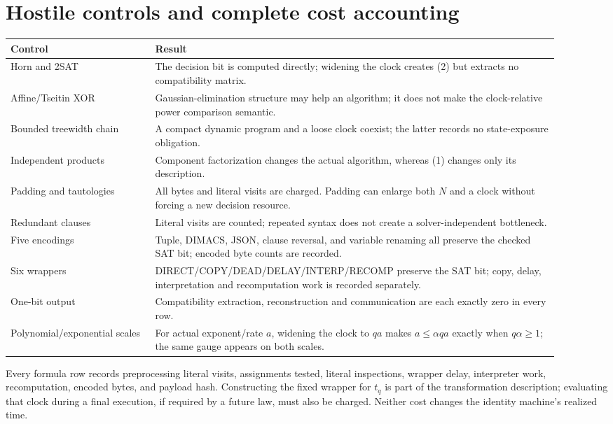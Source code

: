 \documentclass[11pt]{article}
\begin{document}
\section{Hostile controls and complete cost accounting}

\begin{longtable}{p{0.24\linewidth}p{0.67\linewidth}}
\toprule Control & Result\\ \midrule
Horn and 2SAT & The decision bit is computed directly; widening the clock
creates (2) but extracts no compatibility matrix.\\
Affine/Tseitin XOR & Gaussian-elimination structure may help an algorithm;
it does not make the clock-relative power comparison semantic.\\
Bounded treewidth chain & A compact dynamic program and a loose clock coexist;
the latter records no state-exposure obligation.\\
Independent products & Component factorization changes the actual algorithm,
whereas (1) changes only its description.\\
Padding and tautologies & All bytes and literal visits are charged.  Padding
can enlarge both $N$ and a clock without forcing a new decision resource.\\
Redundant clauses & Literal visits are counted; repeated syntax does not
create a solver-independent bottleneck.\\
Five encodings & Tuple, DIMACS, JSON, clause reversal, and variable renaming
all preserve the checked SAT bit; encoded byte counts are recorded.\\
Six wrappers & DIRECT/COPY/DEAD/DELAY/INTERP/RECOMP preserve the SAT bit;
copy, delay, interpretation and recomputation work is recorded separately.\\
One-bit output & Compatibility extraction, reconstruction and communication
are each exactly zero in every row.\\
Polynomial/exponential scales & For actual exponent/rate $a$, widening the
clock to $qa$ makes $a\le\alpha qa$ exactly when $q\alpha\ge1$; the same gauge
appears on both scales.\\
\bottomrule
\end{longtable}

Every formula row records preprocessing literal visits, assignments tested,
literal inspections, wrapper delay, interpreter work, recomputation, encoded
bytes, and payload hash.  Constructing the fixed wrapper for $t_q$ is part of
the transformation description; evaluating that clock during a final
execution, if required by a future law, must also be charged.  Neither cost
changes the identity machine's realized time.
\end{document}
